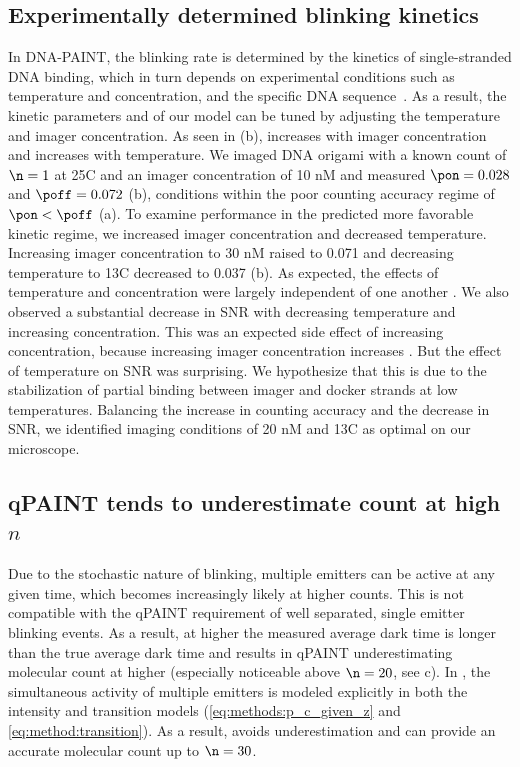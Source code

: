 \subsection{Experimentally determined blinking kinetics} \label{exp_kinetics}
In DNA-PAINT, the blinking rate is determined by the kinetics of single-stranded DNA binding,
which in turn depends on experimental conditions such as temperature and concentration, 
and the specific DNA sequence~\citep{jungmann_single-molecule_2010}.
	As a result, the kinetic parameters \pon and \poff of our model can be 
	tuned by adjusting the temperature and imager concentration. 
	As seen in (b), \pon increases with imager concentration
	and \poff increases with temperature.
	We imaged DNA origami with a known count of $\n=1$ at 25\textdegree C and an 
	imager concentration of 10 nM and measured $\pon=0.028$ and $\poff=0.072$ 
	(b),
	conditions within the poor counting 
	accuracy regime of $\pon < \poff$ (a). %
	To examine performance in the predicted more favorable kinetic regime,  
	we increased imager concentration and decreased temperature.
	Increasing imager concentration to 30 nM raised \pon to 0.071 and 
	decreasing temperature to 13\textdegree C decreased \poff to 0.037 
	(b).
	As expected, the effects of temperature and concentration were largely independent 
	of one another \cite{jungmann_single-molecule_2010}.
	We also observed a substantial decrease in SNR with decreasing temperature 
	and increasing concentration. 
	This was an expected side effect of increasing concentration, because increasing 
	imager concentration increases \rb.
	But the effect of temperature on SNR was surprising. 
	We hypothesize that this is due to the stabilization of partial 
	binding between imager and docker strands at low temperatures.
	Balancing the increase in counting accuracy and the decrease 
	in SNR, we identified imaging conditions of 20 nM and 13\textdegree C as 
	optimal on our microscope.

\subsection{qPAINT tends to underestimate count at high $n$} \label{qpaint_undercount}
Due to the stochastic nature of blinking, multiple emitters can 
be active at any given time, which becomes increasingly likely at higher counts.
	This is not compatible with the qPAINT requirement of well separated, 
	single emitter blinking events.
	As a result, at higher \n the measured average dark time is longer than the true average dark time
	and results in qPAINT underestimating molecular count at higher \n
	(especially noticeable above $\n=20$, see c). 
	In \ours, the simultaneous activity of multiple emitters is modeled explicitly in both the 
	intensity and transition models (\eqref{eq:methods:p_c_given_z} and \eqref{eq:method:transition}). 
	As a result, \ours avoids underestimation and can provide an accurate  
	molecular count up to $\n=30$.

